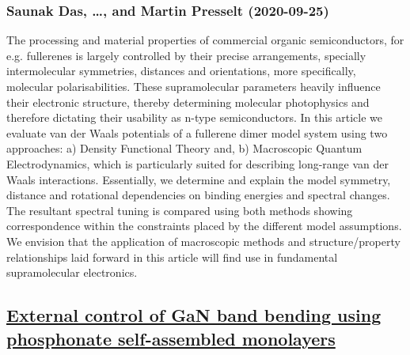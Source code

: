 \subsubsection*{Saunak Das, \dots, and Martin Presselt (2020-09-25)}
The processing and material properties of commercial organic semiconductors,
for e.g. fullerenes is largely controlled by their precise arrangements,
specially intermolecular symmetries, distances and orientations, more
specifically, molecular polarisabilities. These supramolecular parameters
heavily influence their electronic structure, thereby determining molecular
photophysics and therefore dictating their usability as n-type semiconductors.
In this article we evaluate van der Waals potentials of a fullerene dimer model
system using two approaches: a) Density Functional Theory and, b) Macroscopic
Quantum Electrodynamics, which is particularly suited for describing long-range
van der Waals interactions. Essentially, we determine and explain the model
symmetry, distance and rotational dependencies on binding energies and spectral
changes. The resultant spectral tuning is compared using both methods showing
correspondence within the constraints placed by the different model
assumptions. We envision that the application of macroscopic methods and
structure/property relationships laid forward in this article will find use in
fundamental supramolecular electronics.

\subsection*{\href{http://arxiv.org/abs/2009.12089v1}{External control of GaN band bending using phosphonate self-assembled  monolayers}}

